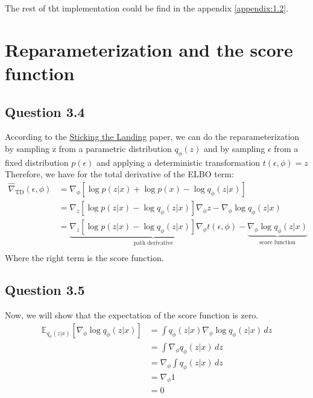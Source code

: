 \documentclass{article}
\begin{document}
The rest of tht implementation could be find in the appendix \ref{appendix:1.2}.

\section{Reparameterization and the score function}
\subsection{Question 3.4}

According to the \href{https://arxiv.org/abs/1703.09194}{Sticking the Landing} paper, we can do the reparameterization by sampling z from a parametric distribution $q_\phi(z)$ and by sampling $\epsilon$ from a fixed distribution $p(\epsilon)$ and applying a deterministic transformation $t(\epsilon, \phi) = z$
Therefore, we have for the total derivative of the ELBO term:
\begin{equation}
  \begin{split}
    \hat{\nabla}_{\text{TD}}(\epsilon,\phi) & = \nabla_\phi[\log p(z|x) + \log p(x) - \log q_\phi (z|x)]                                                                                                                         \\
                                            & = \nabla_z[\log p(z|x) - \log q_\phi(z|x)] \nabla_\phi z - \nabla_\phi \log q_\phi(z|x)                                                                                            \\
                                            & = \underbrace{\nabla_z[\log p(z|x) - \log q_\phi(z|x)] \nabla_\phi t(\epsilon, \phi)}_{\text{path derivative}} - \underbrace{\nabla_\phi \log q_\phi(z|x)}_{\text{score function}} \\
  \end{split}
\end{equation}
Where the right term is the score function.

\subsection{Question 3.5}
Now, we will show that the expectation of the score function is zero.
\begin{equation}
  \begin{split}
    \mathbb{E}_{q_\phi(z|x)}\left[\nabla_\phi \log q_\phi(z|x)\right] & = \int q_\phi(z|x) \nabla_\phi \log q_\phi(z|x) \,dz \\
                                                                      & = \int \nabla_\phi q_\phi(z|x) \,dz                  \\
                                                                      & = \nabla_\phi \int q_\phi(z|x) \,dz                  \\
                                                                      & = \nabla_\phi 1                                      \\
                                                                      & = 0
  \end{split}
\end{equation}
\end{document}
